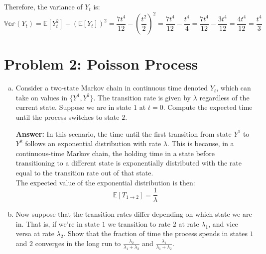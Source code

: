 \documentclass[11pt]{extarticle}
\theoremstyle{plain}
\theoremstyle{definition}
\begin{document}
\begin{enumerate}[(a)]
    Therefore, the variance of \( Y_t \) is:
    \[
    \mathbb{Var}(Y_t) = \mathbb{E}[Y_t^2] - \left( \mathbb{E}[Y_t] \right)^2 = \frac{7 t^4}{12} - \left( \frac{t^2}{2} \right)^2 = \frac{7 t^4}{12} - \frac{t^4}{4} = \frac{7 t^4}{12} - \frac{3 t^4}{12} = \frac{4 t^4}{12} = \frac{t^4}{3}
    \]

\end{enumerate}


\vspace{5mm}
\section*{Problem 2: Poisson Process}

\begin{enumerate}[(a)]
\item Consider a two-state Markov chain in continuous time denoted $Y_t$, which can take on values in $\{Y^1, Y^2\}$. The transition rate is given by $\lambda$ regardless of the current state. Suppose we are in state $1$ at $t = 0$. Compute the expected time until the process switches to state $2$. 

\textbf{Answer:} In this scenario, the time until the first transition from state \( Y^1 \) to \( Y^2 \) follows an exponential distribution with rate \( \lambda \). This is because, in a continuous-time Markov chain, the holding time in a state before transitioning to a different state is exponentially distributed with the rate equal to the transition rate out of that state.\\
The expected value of the exponential distribution is then:
\[
\mathbb{E}[T_{1 \to 2}] = \frac{1}{\lambda}
\]

\item Now suppose that the transition rates differ depending on which state we are in. That is, if we're in state $1$ we transition to rate $2$ at rate $\lambda_1$, and vice versa at rate $\lambda_2$. Show that the fraction of time the process spends in states $1$ and $2$ converges in the long run to $\frac{\lambda_2}{\lambda_1 + \lambda_2}$ and $\frac{\lambda_1}{\lambda_1 + \lambda_2}$.


\end{enumerate}
\end{document}

